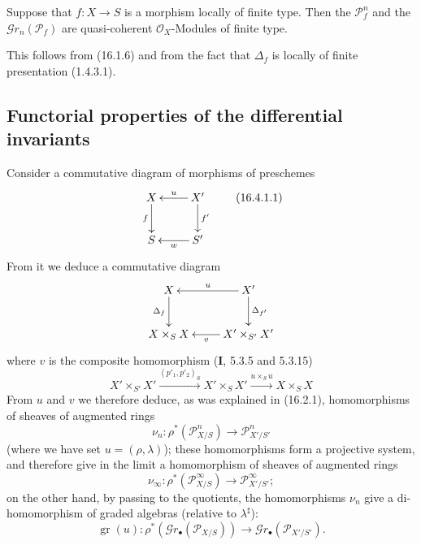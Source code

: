 \begin{proposition}[16.3.9]
\label{IV.16.3.9}
Suppose that $f:X\to S$ is a morphism locally of finite type. Then the
$\mathscr{P}_f^n$ and the $\mathscr{G}r_n(\mathscr{P}_f)$ are quasi-coherent
$\mathcal{O}_X$-Modules of finite type.
\end{proposition}

This follows from (16.1.6) and from the fact that $\Delta_f$ is locally of finite
presentation (1.4.3.1).


\subsection{Functorial properties of the differential invariants}

\begin{env}[16.4.1]
\label{IV.16.4.1}
Consider a commutative diagram of morphisms of preschemes
\[
  \xymatrix{
    X \ar[d]_-{f} & X' \ar[l]_-u \ar[d]^-{f'} \\
    S & S' \ar[l]^-w
  }
  \tag{16.4.1.1}
  \label{IV.16.4.1.1}
\]
From it we deduce a commutative diagram
\[
  \xymatrix{
    X \ar[d]_-{\Delta_f} & X' \ar[l]_-u \ar[d]^-{\Delta_{f'}} \\
    X\times_S X & X'\times_{S'}X' \ar[l]^-v
  }
\]
where $v$ is the composite homomorphism (\textbf{I}, 5.3.5 and 5.3.15)
\[
  X'\times_{S'}X'
  \xrightarrow{(p'_1,p'_2)_S}X'\times_S X'
  \xrightarrow{u\times_S u}X\times_S X
  \tag{16.4.1.2}
  \label{IV.16.4.1.2}
\]
From $u$ and $v$ we therefore deduce, as was explained in (16.2.1),
homomorphisms of sheaves of augmented rings
\[
  \nu_n:\rho^*(\mathscr{P}_{X/S}^n)\longrightarrow
  \mathscr{P}_{X'/S'}^n
  \tag{16.4.1.3}
  \label{IV.16.4.1.3}
\]
(where we have set $u=(\rho,\lambda)$); these homomorphisms form a projective
system, and therefore give in the limit a homomorphism of sheaves of augmented
rings
\[
  \nu_\infty:\rho^*(\mathscr{P}_{X/S}^\infty)\longrightarrow
  \mathscr{P}_{X'/S'}^\infty;
  \tag{16.4.1.4}
  \label{IV.16.4.1.4}
\]
on the other hand, by passing to the quotients, the homomorphisms $\nu_n$ give a
di-homomorphism of graded algebras (relative to $\lambda^\sharp$):
\[
  \operatorname{gr}(u):\rho^*(\mathscr{G}r_\bullet(\mathscr{P}_{X/S}))
  \longrightarrow\mathscr{G}r_\bullet(\mathscr{P}_{X'/S'}).
  \tag{16.4.1.5}
  \label{IV.16.4.1.5}
\]
\end{env}

